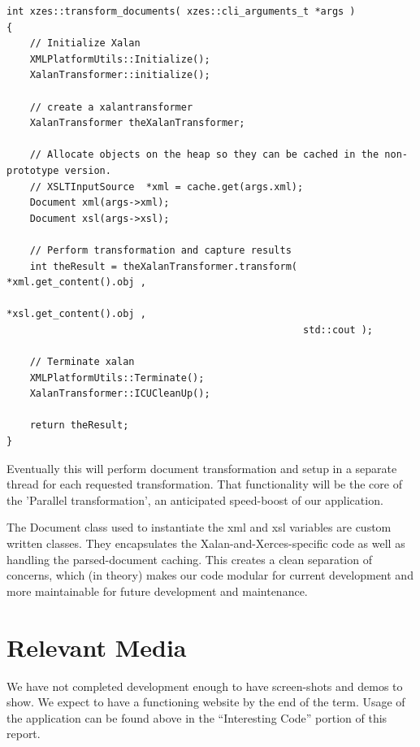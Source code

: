 \begin{lstlisting}
int xzes::transform_documents( xzes::cli_arguments_t *args )
{
    // Initialize Xalan
    XMLPlatformUtils::Initialize();
    XalanTransformer::initialize();

    // create a xalantransformer
    XalanTransformer theXalanTransformer;

    // Allocate objects on the heap so they can be cached in the non-prototype version.
    // XSLTInputSource  *xml = cache.get(args.xml);
    Document xml(args->xml);
    Document xsl(args->xsl);

    // Perform transformation and capture results
    int theResult = theXalanTransformer.transform( *xml.get_content().obj ,
                                                   *xsl.get_content().obj ,
                                                   std::cout );

    // Terminate xalan
    XMLPlatformUtils::Terminate();
    XalanTransformer::ICUCleanUp();

    return theResult;
}
\end{lstlisting}

Eventually this will perform document transformation and setup in a separate thread for each requested transformation.
That functionality will be the core of the 'Parallel transformation', an anticipated speed-boost of our application.

The Document class used to instantiate the xml and xsl variables are custom written classes.
They encapsulates the Xalan-and-Xerces-specific code as well as handling the parsed-document caching.
This creates a clean separation of concerns, which (in theory) makes our code modular for current development and more maintainable for future development and maintenance.

\section{Relevant Media}

We have not completed development enough to have screen-shots and demos to show.
We expect to have a functioning website by the end of the term.
Usage of the application can be found above in the ``Interesting Code'' portion of this report.




\printbibliography


